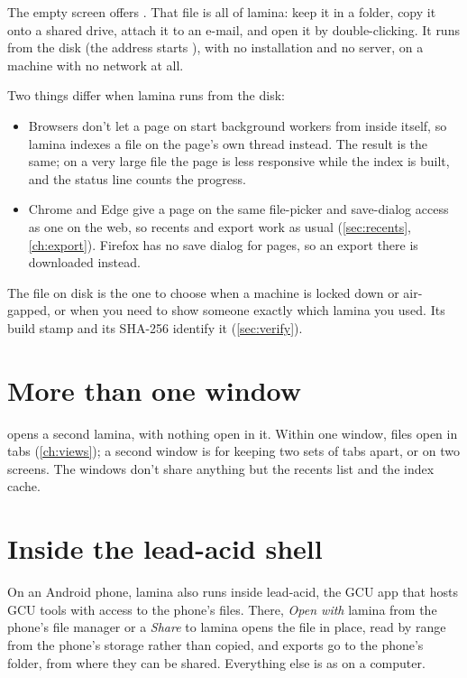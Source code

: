 The empty screen offers . That file is all of lamina: keep it in a folder, copy
it onto a shared drive, attach it to an e-mail, and open it by double-clicking. It runs from the disk
(the address starts ), with no installation and no server, on a machine with no network at
all.

Two things differ when lamina runs from the disk:

\begin{itemize}
\item Browsers don't let a page on  start background workers from inside itself, so lamina
indexes a file on the page's own thread instead. The result is the same; on a very large file the page
is less responsive while the index is built, and the status line counts the progress.
\item Chrome and Edge give a page on  the same file-picker and save-dialog access as one on
the web, so recents and export work as usual (\cref{sec:recents}, \cref{ch:export}). Firefox has no
save dialog for pages, so an export there is downloaded instead.
\end{itemize}

\begin{tip}
The file on disk is the one to choose when a machine is locked down or air-gapped, or when you need to
show someone exactly which lamina you used. Its build stamp and its SHA-256 identify it
(\cref{sec:verify}).
\end{tip}

\section{More than one window}

 opens a second lamina, with nothing open in it. Within one window, files open in
tabs (\cref{ch:views}); a second window is for keeping two sets of tabs apart, or on two screens. The
windows don't share anything but the recents list and the index cache.

\section{Inside the lead-acid shell}

On an Android phone, lamina also runs inside lead-acid, the GCU app that hosts GCU tools with access to
the phone's files. There, \emph{Open with} lamina from the phone's file manager or a \emph{Share} to
lamina opens the file in place, read by range from the phone's storage rather than copied, and exports
go to the phone's  folder, from where they can be shared. Everything else is as on a
computer.

